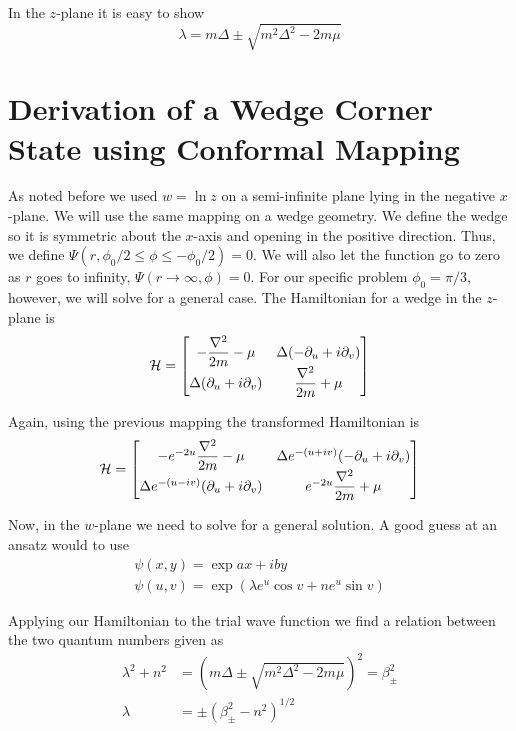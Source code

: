 In the $z$-plane it is easy to show
\begin{equation}
  \lambda = m\Delta \pm \sqrt{m^2\Delta^2 - 2m\mu}
\end{equation}

\section{Derivation of a Wedge Corner State using Conformal Mapping}

As noted before we used $w = \ln{z}$ on a semi-infinite plane lying in the negative $x$-plane.
We will use the same mapping on a wedge geometry.
We define the wedge so it is symmetric about the $x$-axis and opening in the positive direction.
Thus, we define $\Psi(r,\phi_0/2 \leq \phi \leq -\phi_0/2) = 0$.
We will also let the function go to zero as $r$ goes to infinity, $\Psi(r\to\infty,\phi)=0$.
For our specific problem $\phi_0 = \pi / 3$, however, we will solve for a general case.
The Hamiltonian for a wedge in the $z$-plane is
\begin{align}
  \mathcal{H} = 
  \begin{bmatrix}
    -\dfrac{\nabla^2}{2m} - \mu & \Delta (-\partial_u + i \partial_v) \\
    \Delta (\partial_u +i\partial_v) & \dfrac{\nabla^2}{2m} + \mu
  \end{bmatrix}
\end{align}

Again, using the previous mapping the transformed Hamiltonian is
\begin{align}
  \mathcal{H} = 
  \begin{bmatrix}
    -e^{-2u}\dfrac{\nabla^2}{2m} - \mu & \Delta e^{-(u+iv)} (-\partial_u + i \partial_v) \\
    \Delta e^{-(u-iv)}(\partial_u +i\partial_v) & e^{-2u}\dfrac{\nabla^2}{2m} + \mu
  \end{bmatrix}
\end{align}

Now, in the $w$-plane we need to solve for a general solution.
A good guess at an ansatz would to use
\begin{align*}
  \psi(x,y) = \exp{a x + i b y} \\
  \psi(u,v) = \exp(\lambda e^u \cos{v} + n e^u \sin{v} )
\end{align*}

Applying our Hamiltonian to the trial wave function we find a relation between the two quantum numbers given as
\begin{align*}
  \lambda^2 + n^2 & = \left(m\Delta \pm \sqrt{m^2\Delta^2 - 2m\mu}\right)^2 = \beta_{\pm}^2 \\
  \lambda &= \pm \left(\beta_{\pm}^2 - n^2 \right)^{1/2}
\end{align*}


